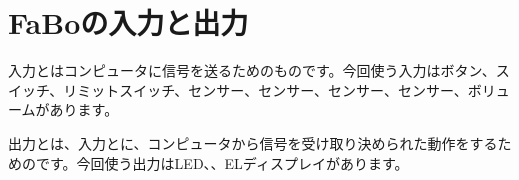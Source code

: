\documentclass[text05.tex]{subfiles}
\begin{document}
\section{FaBoの入力と出力}
入力とはコンピュータに信号を送るためのものです。今回使う入力はボタン、スイッチ、リミットスイッチ、センサー、センサー、センサー、センサー、ボリュームがあります。

出力とは、入力とに、コンピュータから信号を受け取り決められた動作をするためのです。今回使う出力はLED、、ELディスプレイがあります。\\
\begin{tcolorbox}[title=\useOmetoi]
\begin{enumerate}
\end{enumerate}
\end{tcolorbox}
\end{document}
